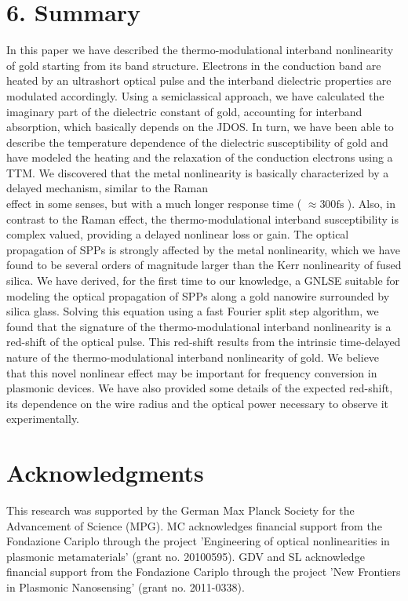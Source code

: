 \documentclass[10pt]{article}
\begin{document}
\section*{6. Summary}
In this paper we have described the thermo-modulational interband nonlinearity of gold starting from its band structure. Electrons in the conduction band are heated by an ultrashort optical pulse and the interband dielectric properties are modulated accordingly. Using a semiclassical approach, we have calculated the imaginary part of the dielectric constant of gold, accounting for interband absorption, which basically depends on the JDOS. In turn, we have been able to describe the temperature dependence of the dielectric susceptibility of gold and have modeled the heating and the relaxation of the conduction electrons using a TTM. We discovered that the metal nonlinearity is basically characterized by a delayed mechanism, similar to the Raman\\
effect in some senses, but with a much longer response time ( $\approx 300 \mathrm{fs}$ ). Also, in contrast to the Raman effect, the thermo-modulational interband susceptibility is complex valued, providing a delayed nonlinear loss or gain. The optical propagation of SPPs is strongly affected by the metal nonlinearity, which we have found to be several orders of magnitude larger than the Kerr nonlinearity of fused silica. We have derived, for the first time to our knowledge, a GNLSE suitable for modeling the optical propagation of SPPs along a gold nanowire surrounded by silica glass. Solving this equation using a fast Fourier split step algorithm, we found that the signature of the thermo-modulational interband nonlinearity is a red-shift of the optical pulse. This red-shift results from the intrinsic time-delayed nature of the thermo-modulational interband nonlinearity of gold. We believe that this novel nonlinear effect may be important for frequency conversion in plasmonic devices. We have also provided some details of the expected red-shift, its dependence on the wire radius and the optical power necessary to observe it experimentally.

\section*{Acknowledgments}
This research was supported by the German Max Planck Society for the Advancement of Science (MPG). MC acknowledges financial support from the Fondazione Cariplo through the project 'Engineering of optical nonlinearities in plasmonic metamaterials' (grant no. 20100595). GDV and SL acknowledge financial support from the Fondazione Cariplo through the project 'New Frontiers in Plasmonic Nanosensing' (grant no. 2011-0338).
\end{document}
